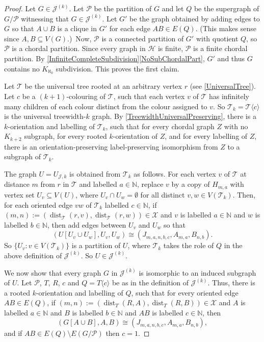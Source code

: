 \documentclass[a4paper,11pt]{article}
\theoremstyle{plain}
\theoremstyle{definition}
\DeclareMathOperator{\dist}{dist}
\newcommand{\XX}{\mathcal{X}}
\newcommand{\HH}{\mathcal{H}}
\newcommand{\JJ}{\mathcal{J}}
\newcommand{\TT}{\mathcal{T}}
\newcommand{\NN}{\mathbb{N}}
\newcommand{\PART}{\mathcal{P}}
\newcommand{\GGG}[2]{#1\langle{#2}\rangle}
\begin{document}
\begin{proof}
Let $G\in\JJ^{(k)}$. Let $\PART$ be the partition of $G$ and let $Q$ be the supergraph of $G/\PART$ witnessing that $G\in\JJ^{(k)}$. Let $G'$ be the graph obtained by adding edges to $G$ so that $A\cup B$ is a clique in $G'$ for each edge $AB\in E(Q)$. (This makes sense since $A,B\subseteq V(G)$.)\ Now, $\PART$ is a connected partition of $G'$ with quotient $Q$, so $\PART$ is a chordal partition. Since every graph in $\HH$ is finite, $\PART$ is a finite chordal partition. By \cref{InfiniteCompleteSubdivision}\cref{NoSubChordalPart}, $G'$ and thus $G$ contains no $K_{\aleph_0}$ subdivision. This proves the first claim. 

Let $\TT$ be the universal tree rooted at an arbitrary vertex $r$ (see \cref{UniversalTree}). Let $c$ be a $(k+1)$-colouring of $\TT$, such that each vertex $v$ of $\TT$ has infinitely many children of each colour distinct from the colour assigned to $v$. So $\TT_k=\GGG{\TT}{c}$ is the universal treewidth-$k$ graph. By \cref{TreewidthUniversalPreserving}, there is a $k$-orientation and labelling of $\TT_k$, such that for every chordal graph $Z$ with no $K_{k+2}$ subgraph, for every rooted $k$-orientation of $Z$, and for every labelling of $Z$, there is an orientation-preserving label-preserving isomorphism from $Z$ to a subgraph of $\TT_k$. 

The graph $U=U_{\JJ,k}$ is obtained from $\TT_k$ as follows. For each vertex $v$ of $\TT$ at distance $m$ from $r$ in $\TT$ and labelled $a\in\NN$, replace $v$ by a copy of $H_{m,a}$ with vertex set $U_v\subseteq V(U)$, where $U_v\cap U_w=\emptyset$ for all distinct $v,w\in V(\TT_k)$. Then, for each oriented edge $vw$ of $\TT_k$ labelled $c\in \NN$, if $(m,n):=(\dist_{\TT}(r,v),\dist_{\TT}(r,w))\in\XX$ and $v$ is labelled $a\in\NN$ and $w$ is labelled $b\in\NN$, then add edges between $U_v$ and $U_w$ so that 
\begin{equation}
\label{Iso}
(U[ U_v \cup U_w ], U_v, U_w) \cong (J_{m,a,n,b,c},A_{m,a},B_{n,b}).
\end{equation}
So $\{U_v:v\in V(\TT_k)\}$ is a partition of $U$, where $\TT_k$ takes the role of $Q$ in the above definition of $\JJ^{(k)}$. So $U\in \JJ^{(k)}$. 

We now show that every graph $G$ in $\JJ^{(k)}$ is isomorphic to an induced subgraph of $U$. Let $\PART$, $T$, $R$, $c$ and $Q=\GGG{T}{c}$ be as in the definition of $\JJ^{(k)}$. Thus, there is a rooted $k$-orientation and labelling of $Q$, such that for every oriented edge $AB\in E(Q)$, 
if $(m,n):=(\dist_T(R,A),\dist_T(R,B))\in\XX$ and $A$ is labelled $a\in\NN$ and $B$ is labelled $b\in\NN$ and $AB$ is labelled $c\in\NN$, then 
\begin{equation}
\label{IsoIso}
(G[A\cup B],A,B)\cong (J_{m,a,n,b,c},A_{m,a},B_{n,b}), 
\end{equation}
and if $AB\in E(Q)\setminus E(G/\PART)$ then $c=1$.


\end{proof}
\end{document}
